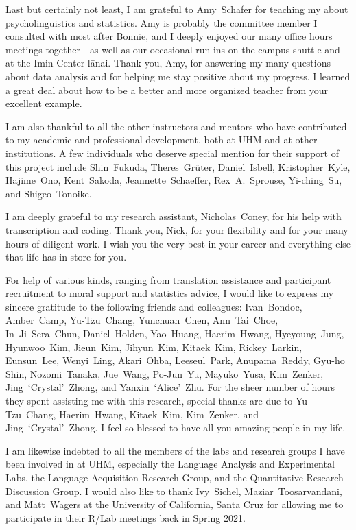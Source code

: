 Last but certainly not least, I am grateful to Amy~Schafer for teaching my about psycholinguistics and statistics. Amy is probably the committee member I consulted with most after Bonnie, and I deeply enjoyed our many office hours meetings together---as well as our occasional run-ins on the campus shuttle and at the Imin Center lānai. Thank you, Amy, for answering my many questions about data analysis and for helping me stay positive about my progress. I learned a great deal about how to be a better and more organized teacher from your excellent example.

I am also thankful to all the other instructors and mentors who have contributed to my academic and professional development, both at UHM and at other institutions. A few individuals who deserve special mention for their support of this project include Shin~Fukuda, Theres~Grüter, Daniel~Isbell, Kristopher~Kyle, Hajime~Ono, Kent~Sakoda, Jeannette~Schaeffer, Rex~A.~Sprouse, Yi-ching~Su, and Shigeo~Tonoike.

I am deeply grateful to my research assistant, Nicholas~Coney, for his help with transcription and coding. Thank you, Nick, for your flexibility and for your many hours of diligent work. I wish you the very best in your career and everything else that life has in store for you.

For help of various kinds, ranging from translation assistance and participant recruitment to moral support and statistics advice, I would like to express my sincere gratitude to the following friends and colleagues: Ivan~Bondoc, Amber~Camp, Yu-Tzu~Chang, Yunchuan~Chen, Ann~Tai~Choe, In~Ji~Sera~Chun, Daniel~Holden, Yao~Huang, Haerim~Hwang, Hyeyoung~Jung, Hyunwoo~Kim, Jieun~Kim, Jihyun~Kim, Kitaek~Kim, Rickey~Larkin, Eunsun~Lee, Wenyi~Ling, Akari~Ohba, Leeseul~Park, Anupama~Reddy, Gyu-ho Shin, Nozomi~Tanaka, Jue~Wang, Po-Jun~Yu, Mayuko~Yusa, Kim~Zenker, Jing~`Crystal'~Zhong, and Yanxin~`Alice'~Zhu. For the sheer number of hours they spent assisting me with this research, special thanks are due to Yu-Tzu~Chang, Haerim~Hwang, Kitaek~Kim, Kim~Zenker, and Jing~`Crystal'~Zhong. I feel so blessed to have all you amazing people in my life.

I am likewise indebted to all the members of the labs and research groups I have been involved in at UHM, especially the Language Analysis and Experimental Labs, the Language Acquisition Research Group, and the Quantitative Research Discussion Group. I would also like to thank Ivy~Sichel, Maziar~Toosarvandani, and Matt~Wagers at the University of California, Santa Cruz for allowing me to participate in their R/Lab meetings back in Spring 2021.

